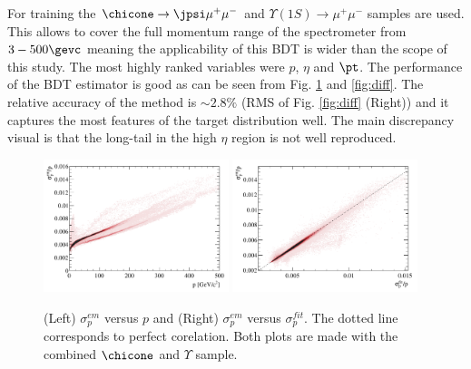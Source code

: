 For training the  $\chicone \rightarrow \jpsi \mu^+ \mu^-$ and $\Upsilon(1S) \rightarrow
\mu^+ \mu^-$ samples are used. This allows to cover the full momentum
range of the spectrometer from $3-500 \gevc$ meaning the applicability of this BDT is
wider than the scope of this study. The most highly ranked variables
were $p$, $\eta$ and $\pt$. The performance of the BDT
estimator is good as can be seen from Fig. \ref{fig:corel} and
\ref{fig:diff}. The relative accuracy of the method is $\sim 2.8 \%$
(RMS of Fig. \ref{fig:diff} (Right)) and
it captures the most features of the target distribution well. The
main discrepancy visual is that the long-tail in the high $\eta$ region is
not well reproduced. 
%
\begin{figure}[h!]
\centering
\includegraphics[width=0.48\textwidth]{figs/epp-em.pdf}
\includegraphics[width=0.48\textwidth]{figs/corelation.pdf}
\caption{(Left) $\sigma^{em}_{p}$ versus $p$ and (Right)
  $\sigma^{em}_{p}$  versus  $\sigma^{fit}_{p}$. The dotted line
  corresponds to perfect corelation. Both plots are made with the combined
  $\chicone$ and $\Upsilon$ sample.  }
\label{fig:corel}
\end{figure}
%
